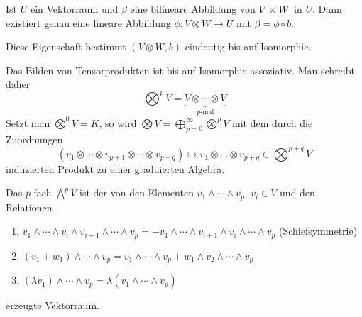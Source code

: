 \begin{emptythm}
Ist $U$ ein Vektorraum und $\beta$ eine bilineare Abbildung von $V \times W$ in $U$. Dann existiert genau eine lineare Abbildung $\phi: V \otimes W \to U$ mit $\beta = \phi \circ b$.
\begin{center}\end{center}
Diese Eigenschaft bestimmt $(V \otimes W, b)$ eindeutig bis auf Isomorphie.
\end{emptythm}

Das Bilden von Tensorprodukten ist bis auf Isomorphie assoziativ. Man schreibt daher
	\[ \bigotimes^p V = \underbrace{V \otimes \cdots \otimes V}_{p\text{-mal}} \]
Setzt man $\bigotimes^0 V = K$, so wird $\bigotimes V = \bigoplus_{p=0}^{\infty} \bigotimes^p V$ mit dem durch die Zuordnungen
	\[ (v_1 \otimes \cdots \otimes v_{p+1} \otimes \cdots \otimes v_{p+q}) \mapsto v_1 \otimes \ldots \otimes v_{p+q} \in \bigotimes^{p+q} V \]
induzierten Produkt zu einer graduierten Algebra.

Das $p$-fach  $\bigwedge^pV$ ist der von den Elementen $v_1 \wedge \cdots \wedge v_p$, $v_i \in V$ und den Relationen \begin{enumerate}[label=(\roman*),widest=iii]
\item
	$v_1 \wedge \cdots \wedge v_i \wedge v_{i+1} \wedge \cdots \wedge v_p = - v_1 \wedge \cdots \wedge v_{i+1} \wedge v_i \wedge \cdots \wedge v_p$ (Schiefsymmetrie)
\item
	$(v_1 + w_1) \wedge \cdots \wedge v_p = v_1 \wedge \cdots \wedge v_p + w_1 \wedge v_2 \wedge \cdots \wedge v_p$
\item
	$(\lambda v_1) \wedge \cdots \wedge v_p = \lambda (v_1 \wedge \cdots \wedge v_p)$
\end{enumerate}
erzeugte Vektorraum.

